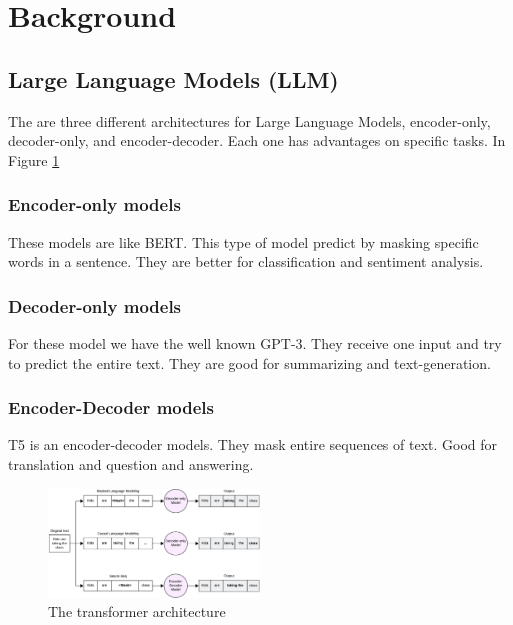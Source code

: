 

\section{Background}

\subsection{Large Language Models (LLM)}

The are three different architectures for Large Language Models, encoder-only, decoder-only, and encoder-decoder. Each one has advantages on specific tasks. In Figure \ref{architecture}

\subsubsection{Encoder-only models}
These models are like BERT.
This type of model predict by masking specific words in a sentence.
They are better for classification and sentiment analysis.

\subsubsection{Decoder-only models}
For these model we have the well known GPT-3.
They receive one input and try to predict the entire text.
They are good for summarizing and text-generation.

\subsubsection{Encoder-Decoder models}
T5 is an encoder-decoder models.
They mask entire sequences of text.
Good for translation and question and answering.

\begin{figure}[!ht]
    \centering
        \includegraphics[width=0.5\textwidth]{figures/LLM_Arch_text_generation.png}
        \caption{The transformer architecture}
        \label{architecture}
\end{figure}

